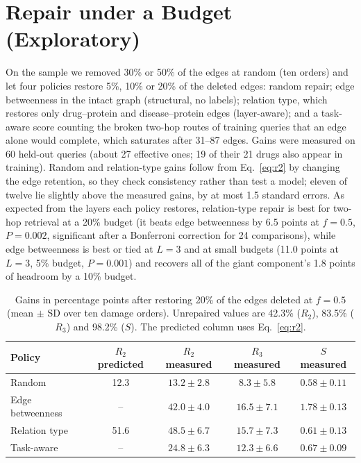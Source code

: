 \section{Repair under a Budget (Exploratory)}
\label{sec:repair}

On the sample we removed 30\% or 50\% of the edges at random (ten orders) and let
four policies restore 5\%, 10\% or 20\% of the deleted edges: random repair;
edge betweenness in the intact graph (structural, no labels); relation type,
which restores only drug--protein and disease--protein edges (layer-aware); and a
task-aware score counting the broken two-hop routes of training queries that an
edge alone would complete, which saturates after 31--87 edges. Gains were
measured on 60 held-out queries (about 27 effective ones; 19 of their 21 drugs
also appear in training). Random and relation-type gains follow from
Eq.~\eqref{eq:r2} by changing the edge retention, so they check consistency
rather than test a model; eleven of twelve lie slightly above the measured
gains, by at most 1.5 standard errors. As expected from the layers each policy
restores, relation-type repair is best for two-hop retrieval at a 20\% budget
(it beats edge betweenness by 6.5 points at $f=0.5$, $P=0.002$, significant after
a Bonferroni correction for 24 comparisons), while edge betweenness is best or
tied at $L=3$ and at small budgets (11.0 points at $L=3$, 5\% budget,
$P=0.001$) and recovers all of the giant component's 1.8 points of headroom by
a 10\% budget.

\begin{table}[!htbp]
\centering
\small
\caption{Gains in percentage points after restoring 20\% of the edges deleted at
$f=0.5$ (mean $\pm$ SD over ten damage orders). Unrepaired values are 42.3\%
($R_2$), 83.5\% ($R_3$) and 98.2\% ($S$). The predicted column uses
Eq.~\eqref{eq:r2}.}
\label{tab:repair}
\begin{tabular}{@{}lcccc@{}}
\toprule
Policy & $R_2$ predicted & $R_2$ measured & $R_3$ measured & $S$ measured \\
\midrule
Random            & 12.3 & $13.2 \pm 2.8$ & $8.3 \pm 5.8$  & $0.58 \pm 0.11$ \\
Edge betweenness  & --   & $42.0 \pm 4.0$ & $16.5 \pm 7.1$ & $1.78 \pm 0.13$ \\
Relation type     & 51.6 & $48.5 \pm 6.7$ & $15.7 \pm 7.3$ & $0.61 \pm 0.13$ \\
Task-aware        & --   & $24.8 \pm 6.3$ & $12.3 \pm 6.6$ & $0.67 \pm 0.09$ \\
\bottomrule
\end{tabular}
\end{table}

